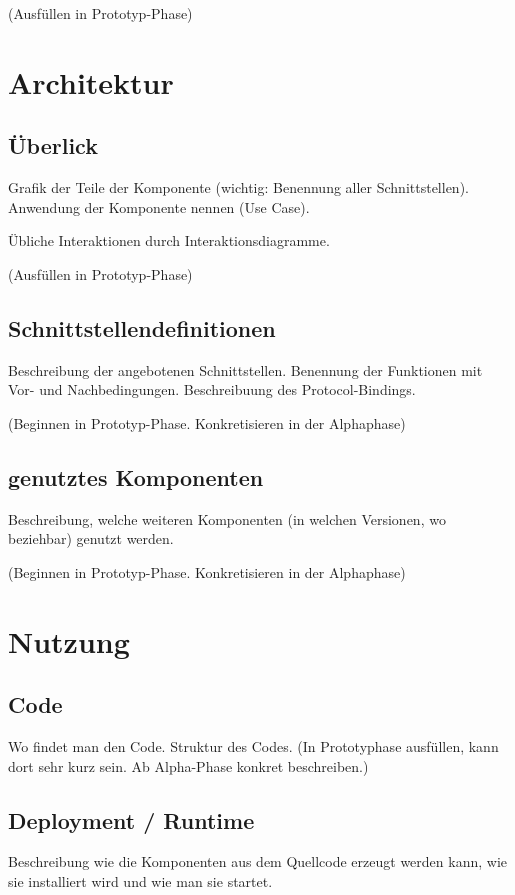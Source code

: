 (Ausfüllen in Prototyp-Phase)

\section{Architektur}

\subsection{Überlick}
Grafik der Teile der Komponente (wichtig: Benennung aller Schnittstellen). 
Anwendung der Komponente nennen (Use Case).

Übliche Interaktionen durch Interaktionsdiagramme.

(Ausfüllen in Prototyp-Phase)

\subsection{Schnittstellendefinitionen}
Beschreibung der angebotenen Schnittstellen. Benennung der Funktionen
mit Vor- und Nachbedingungen. Beschreibuung des Protocol-Bindings.

(Beginnen in Prototyp-Phase. Konkretisieren in der Alphaphase)

\subsection{genutztes Komponenten}
Beschreibung, welche weiteren Komponenten (in welchen Versionen, wo beziehbar) genutzt werden.

(Beginnen in Prototyp-Phase. Konkretisieren in der Alphaphase)

\section{Nutzung}
\subsection{Code}
Wo findet man den Code. Struktur des Codes. (In Prototyphase ausfüllen,
kann dort sehr kurz sein. Ab Alpha-Phase konkret beschreiben.)

\subsection{Deployment / Runtime}
Beschreibung wie die Komponenten aus dem Quellcode erzeugt werden kann,
wie sie installiert wird und wie man sie startet.

